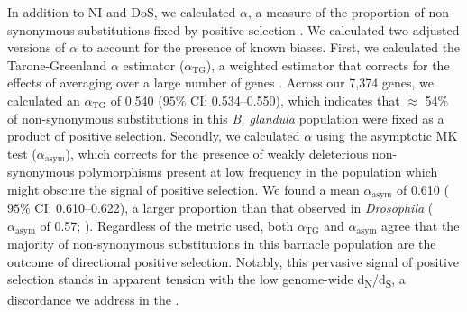 \documentclass[11pt]{article}
\newcommand{\dnds}{d\textsubscript{N}/d\textsubscript{S}\xspace}
\newcommand{\bgla}{\textit{B. glandula}\xspace}
\begin{document}
In addition to NI and DoS, we calculated $\alpha$, a measure of the proportion
of non-synonymous substitutions fixed by positive selection \citep{smith_adaptive_2002}.
We calculated two adjusted versions of $\alpha$ to account for the presence of known
biases.
First, we calculated the Tarone-Greenland $\alpha$ estimator ($\alpha_\text{TG}$), a
weighted estimator that corrects for the effects of averaging over a large number of
genes \citep{stoletzki_estimation_2011}.
Across our 7,374 genes, we calculated an $\alpha_\text{TG}$ of 0.540 ($95\%$ CI:
0.534--0.550), which indicates that $\approx$ 54\% of non-synonymous substitutions in
this \bgla{} population were fixed as a product of positive selection.
Secondly, we calculated $\alpha$ using the asymptotic MK test ($\alpha_\text{asym}$),
which corrects for the presence of weakly deleterious non-synonymous polymorphisms
present at low frequency in the population \citep{messer_frequent_2013} which might
obscure the signal of positive selection.
We found a mean $\alpha_\text{asym}$ of 0.610 ($95\%$ CI: 0.610--0.622), a
larger proportion than that observed in \textit{Drosophila} ($\alpha_\text{asym}$
of 0.57; \citealp{haller_asymptoticmk_2017}).
Regardless of the metric used, both $\alpha_\text{TG}$ and $\alpha_\text{asym}$ agree
that the majority of non-synonymous substitutions in this barnacle population are the
outcome of directional positive selection.
Notably, this pervasive signal of positive selection stands in apparent tension with
the low genome-wide \dnds{}, a discordance we address in the .
\vspace{0.2cm}
\end{document}
